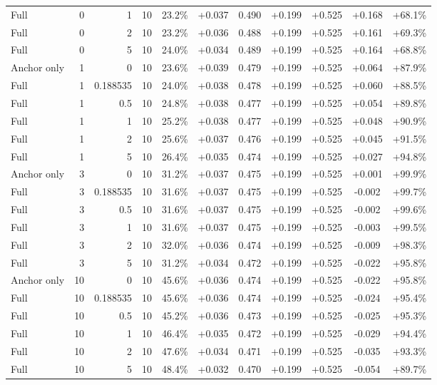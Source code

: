 \begin{table}[htbp]
\begin{tabular}{lrrrccccccc}
Full & 0 & 1 & 10 & 23.2\% & +0.037 & 0.490 & +0.199 & +0.525 & +0.168 & +68.1\% \\
Full & 0 & 2 & 10 & 23.2\% & +0.036 & 0.488 & +0.199 & +0.525 & +0.161 & +69.3\% \\
Full & 0 & 5 & 10 & 24.0\% & +0.034 & 0.489 & +0.199 & +0.525 & +0.164 & +68.8\% \\
Anchor only & 1 & 0 & 10 & 23.6\% & +0.039 & 0.479 & +0.199 & +0.525 & +0.064 & +87.9\% \\
Full & 1 & 0.188535 & 10 & 24.0\% & +0.038 & 0.478 & +0.199 & +0.525 & +0.060 & +88.5\% \\
Full & 1 & 0.5 & 10 & 24.8\% & +0.038 & 0.477 & +0.199 & +0.525 & +0.054 & +89.8\% \\
Full & 1 & 1 & 10 & 25.2\% & +0.038 & 0.477 & +0.199 & +0.525 & +0.048 & +90.9\% \\
Full & 1 & 2 & 10 & 25.6\% & +0.037 & 0.476 & +0.199 & +0.525 & +0.045 & +91.5\% \\
Full & 1 & 5 & 10 & 26.4\% & +0.035 & 0.474 & +0.199 & +0.525 & +0.027 & +94.8\% \\
Anchor only & 3 & 0 & 10 & 31.2\% & +0.037 & 0.475 & +0.199 & +0.525 & +0.001 & +99.9\% \\
Full & 3 & 0.188535 & 10 & 31.6\% & +0.037 & 0.475 & +0.199 & +0.525 & -0.002 & +99.7\% \\
Full & 3 & 0.5 & 10 & 31.6\% & +0.037 & 0.475 & +0.199 & +0.525 & -0.002 & +99.6\% \\
Full & 3 & 1 & 10 & 31.6\% & +0.037 & 0.475 & +0.199 & +0.525 & -0.003 & +99.5\% \\
Full & 3 & 2 & 10 & 32.0\% & +0.036 & 0.474 & +0.199 & +0.525 & -0.009 & +98.3\% \\
Full & 3 & 5 & 10 & 31.2\% & +0.034 & 0.472 & +0.199 & +0.525 & -0.022 & +95.8\% \\
Anchor only & 10 & 0 & 10 & 45.6\% & +0.036 & 0.474 & +0.199 & +0.525 & -0.022 & +95.8\% \\
Full & 10 & 0.188535 & 10 & 45.6\% & +0.036 & 0.474 & +0.199 & +0.525 & -0.024 & +95.4\% \\
Full & 10 & 0.5 & 10 & 45.2\% & +0.036 & 0.473 & +0.199 & +0.525 & -0.025 & +95.3\% \\
Full & 10 & 1 & 10 & 46.4\% & +0.035 & 0.472 & +0.199 & +0.525 & -0.029 & +94.4\% \\
Full & 10 & 2 & 10 & 47.6\% & +0.034 & 0.471 & +0.199 & +0.525 & -0.035 & +93.3\% \\
Full & 10 & 5 & 10 & 48.4\% & +0.032 & 0.470 & +0.199 & +0.525 & -0.054 & +89.7\% \\

\end{tabular}
\end{table}
